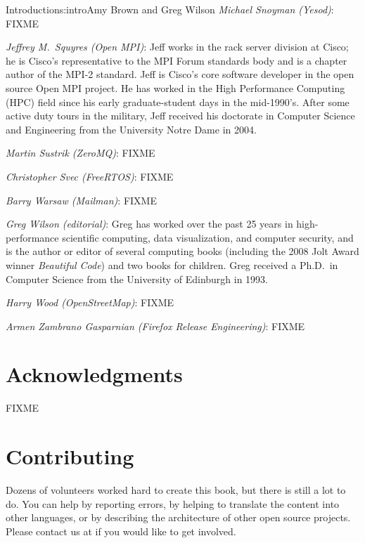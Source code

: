 \begin{aosachapter}{Introduction}{s:intro}{Amy Brown and Greg Wilson}
\emph{Michael Snoyman (Yesod)}: FIXME

\emph{Jeffrey M.\ Squyres (Open MPI)}: Jeff works in the rack server
division at Cisco; he is Cisco's representative to the MPI Forum
standards body and is a chapter author of the MPI-2 standard.  Jeff is
Cisco's core software developer in the open source Open MPI project.
He has worked in the High Performance Computing (HPC) field since his
early graduate-student days in the mid-1990's.  After some active duty
tours in the military, Jeff received his doctorate in Computer Science
and Engineering from the University Notre Dame in 2004.

\emph{Martin Sustrik (ZeroMQ)}: FIXME

\emph{Christopher Svec (FreeRTOS)}: FIXME

\emph{Barry Warsaw (Mailman)}: FIXME

\emph{Greg Wilson (editorial)}: Greg has worked over the past 25 years
in high-performance scientific computing, data visualization, and
computer security, and is the author or editor of several computing
books (including the 2008 Jolt Award winner \emph{Beautiful Code}) and
two books for children.  Greg received a Ph.D.\ in Computer Science
from the University of Edinburgh in 1993.

\emph{Harry Wood (OpenStreetMap)}: FIXME

\emph{Armen Zambrano Gasparnian (Firefox Release Engineering)}: FIXME

\section*{Acknowledgments}

FIXME

\section*{Contributing}

Dozens of volunteers worked hard to create this book, but there is
still a lot to do.  You can help by reporting errors, by helping to
translate the content into other languages, or by describing the
architecture of other open source projects.  Please contact us at
 if you would like to get involved.

\end{aosachapter}

